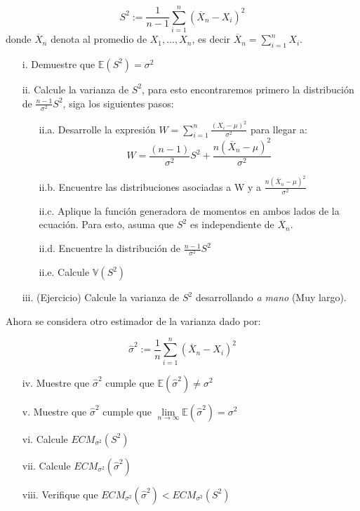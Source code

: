 \begin{enumerate}
\[S^2 := \frac{1}{n-1}\sum\limits_{i=1}^{n}(\overline{X}_n-X_i)^2\]
donde $\overline{X}_n$ denota al promedio de $X_1,..., X_n$, es decir  $\overline{X}_n = \sum\limits_{i=1}^{n}X_i$. 
\begin{enumerate}
    \item [i.] Demuestre que $\mathbb{E}(S^2) = \sigma^2$ 
    \item [ii.] Calcule la varianza de $S^2$, para esto encontraremos primero la distribución de $\frac{n-1}{\sigma^2}S^2$, siga los siguientes pasos:
    \begin{enumerate}
        \item [ii.a.] Desarrolle la expresión $W=\sum\limits_{i=1}^{n}\frac{(X_i-\mu)^2}{\sigma^2}$ para llegar a:
        \[W = \frac{(n-1)}{\sigma^2}S^2  + \frac{n(\overline{X}_n-\mu)^2}{\sigma^2} \]
        \item [ii.b.] Encuentre las distribuciones asociadas a W y a $\frac{n(\overline{X}_n-\mu)^2}{\sigma^2} $
        \item [ii.c.] Aplique la función generadora de momentos en ambos lados de la ecuación. Para esto, asuma que $S^2$ es independiente de $\overline{X}_n$.
        \item [ii.d.] Encuentre la distribución de $\frac{n-1}{\sigma^2}S^2$
        \item [ii.e.] Calcule $\mathbb{V}(S^2)$
    \end{enumerate}
    \item [iii.] (Ejercicio) Calcule la varianza de $S^2$ desarrollando \textit{a mano} (Muy largo). 
\end{enumerate}


Ahora se considera otro estimador de la varianza dado por:

\[\hat{\sigma}^2 := \frac{1}{n}\sum\limits_{i=1}^{n}(\overline{X}_n - X_i)^2    \]

\begin{enumerate}
    \item [iv.] Muestre que $\hat{\sigma}^2$ cumple que $\mathbb{E}(\hat{\sigma}^2) \neq \sigma^2$ 
    \item [v.] Muestre que $\hat{\sigma}^2$ cumple que $\lim\limits_{n\rightarrow \infty} \mathbb{E}(\hat{\sigma}^2) = \sigma^2$
\end{enumerate}

\begin{enumerate}
    \item [vi.] Calcule $ECM_{\sigma^2}(S^2)$
    \item [vii.] Calcule $ECM_{\sigma^2}(\hat{\sigma}^2) $
    \item [viii.] Verifique que $ECM_{\sigma^2}(\hat{\sigma}^2) < ECM_{\sigma^2}(S^2)$
\end{enumerate}
\end{enumerate}
